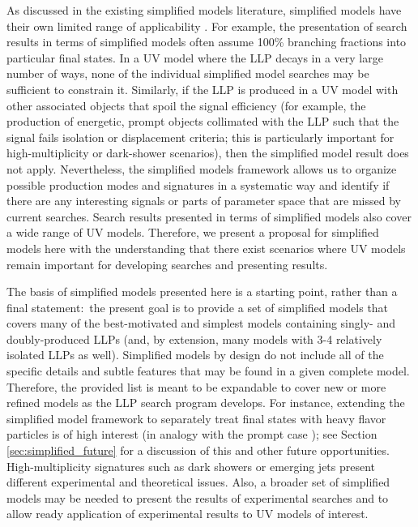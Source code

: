 As discussed in the existing simplified models literature, simplified models have their own limited range of applicability \cite{Alves:2011wf,Abdallah:2015ter}. For example, the presentation of search results in terms of simplified models often assume 100\% branching fractions into particular final states. In a UV model where the LLP decays in a very large number of ways, none of the individual simplified model searches may be sufficient to constrain it. Similarly, if the LLP is produced in a UV model with other associated objects that spoil the signal efficiency (for example, the production of energetic, prompt objects collimated with the LLP such that the signal fails isolation or displacement criteria; this is particularly important for high-multiplicity or dark-shower scenarios), then the simplified model result does not apply. Nevertheless, the simplified models framework allows us to organize possible production modes and signatures in a systematic way and identify if there are any interesting signals or parts of parameter space that are missed by current searches. Search results presented in terms of simplified models also cover a wide range of UV models. Therefore, we present a proposal for simplified models here with the understanding that there exist scenarios where UV models remain important for developing searches and presenting results.

The basis of simplified models presented here is  a starting point, rather than a final statement:~the present goal is to provide a set of simplified models that covers many of the best-motivated and simplest models containing singly- and doubly-produced LLPs (and, by extension, many models with 3-4 relatively isolated LLPs as well). Simplified models by design do not include all of the specific details and subtle features that may be found in a given complete model.  Therefore, the provided list is meant to be expandable to cover new or more refined models as the LLP search program develops.  For instance,  extending the simplified model framework to separately treat final states with heavy flavor particles is of high interest (in analogy with the prompt case \cite{Essig:2011qg,Brust:2011tb,Papucci:2011wy}); see Section \ref{sec:simplified_future} for a discussion of this and other future opportunities.   High-multiplicity signatures such as dark showers or emerging jets present different experimental and theoretical issues. Also, a broader set of simplified models may be needed to present the results of experimental searches and to allow ready application of experimental results to UV models of interest. 



